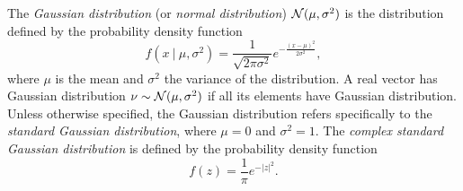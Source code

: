 The \textit{Gaussian distribution} (or \textit{normal distribution}) ${\mathcal N}(\mu, \sigma^2)$ is the distribution defined by the probability density function
\begin{equation} 			\label{Def:Gaussian_distribution}
f\left(x \ | \ \mu, \sigma^2\right) = \frac{1}{\sqrt{2\pi \sigma^2}}e^{-\frac{(x-\mu)^2}{2\sigma^2}},
\end{equation}
where $\mu$ is the mean and $\sigma^2$ the variance of the distribution.  A real vector has Gaussian distribution $\nu \sim {\mathcal N}(\mu, \sigma^2)$ if all its elements have Gaussian distribution.  Unless otherwise specified, the Gaussian distribution refers specifically to the \textit{standard Gaussian distribution}, where $\mu = 0$ and $\sigma^2 = 1$.  The \textit{complex standard Gaussian distribution} is defined by the probability density function
\begin{equation} 			\label{Def:Gaussian_distribution_complex}
f(z) = \frac{1}{\pi}e^{-|z|^2}.
\end{equation}


